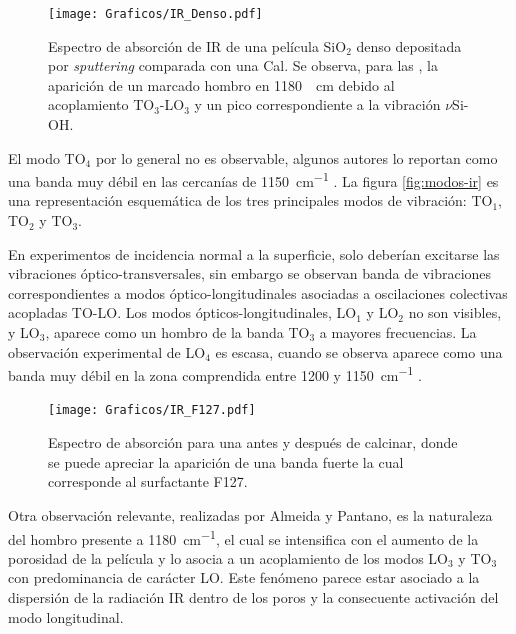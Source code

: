 				
		  \begin{figure}[!b]
						\begin{center}
						\texttt{[image: Graficos/IR\_Denso.pdf]}
						\caption[FTIR SiO$_2$ denso y SiO$_2$ mesoporoso.]{Espectro de absorción de IR de una película SiO$_2$ denso depositada por \textit{sputtering }comparada con una Cal\pdmF. Se observa, para las \pdm, la aparición de un marcado hombro en \SI{1180}{\per\cm} debido al acoplamiento TO$_3$-LO$_3$ y un pico correspondiente a la vibración $\nu$Si-OH.}
						\label{fig:IR-denso}
						\end{center}
						\end{figure}

		 El modo TO$_4$ por lo general no es observable, algunos autores lo reportan como una banda muy débil en las cercanías de \SI{1150}{\cm^{-1}} \cite{Pai1986,Grosse1986}. La figura \ref{fig:modos-ir} es una representación esquemática de los tres principales modos de vibración: TO$_1$, TO$_2$ y TO$_3$.

		 En experimentos de incidencia normal a la superficie, solo deberían excitarse las vibraciones óptico-transversales, sin embargo se observan banda de vibraciones correspondientes a modos óptico-longitudinales asociadas a oscilaciones colectivas acopladas TO-LO\cite{Pai1986,Grosse1986,Innocenzi2003}. Los modos ópticos-longitudinales, LO$_1$ y LO$_2$ no son visibles, y LO$_3$, aparece como un hombro de la banda TO$_3$ a mayores frecuencias. La observación experimental de LO$_4$ es escasa, cuando se observa aparece como una banda muy débil en la zona comprendida entre 1200 y \SI{1150}{\cm^{-1}} \cite{Pai1986,Grosse1986}.
		 

				\begin{figure}[b!]
						\begin{center}
						\texttt{[image: Graficos/IR\_F127.pdf]}
						\caption[FTIR para una \pdmF.]{Espectro de absorción para una \pdmF\space antes y después de calcinar, donde se puede apreciar la aparición de una banda fuerte la cual corresponde al surfactante F127.}
						\label{fig:IR_F127_calciando}
						\end{center}
						\end{figure}

		 Otra observación relevante, realizadas por Almeida y Pantano\cite{Almeida1990}, es la naturaleza del hombro presente a \SI{1180}{\cm^{-1}}, el cual se intensifica con el aumento de la porosidad de la película y lo asocia a un acoplamiento de los modos LO$_3$ y TO$_3$ con predominancia de carácter LO. Este fenómeno parece estar asociado a la dispersión de la radiación IR dentro de los poros y la consecuente activación del modo longitudinal.	
			
